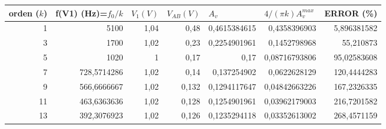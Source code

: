 \documentclass{article}
\begin{document}
\begin{table}[h]
\centering
\begin{tabular}{|r|r|r|r|r|r|r|}
\hline
\multicolumn{1}{|l|}{orden ($k$)} & \multicolumn{1}{l|}{f(V1) (Hz)=$f_0/k$} & \multicolumn{1}{l|}{$V_1(V)$} & \multicolumn{1}{l|}{$V_{AB}(V)$} & \multicolumn{1}{l|}{$A_v$} & \multicolumn{1}{l|}{$4/(\pi k) A_{v}^{max}$} & \multicolumn{1}{l|}{ERROR (\%)} \\ \hline
1                                            & 5100                                            & 1,04                          & 0,48                             & 0,4615384615               & 0,4358396903                                 & 5,896381582                     \\ \hline
3                                            & 1700                                            & 1,02                          & 0,23                             & 0,2254901961               & 0,1452798968                                 & 55,210873                       \\ \hline
5                                            & 1020                                            & 1                             & 0,17                             & 0,17                       & 0,08716793806                                & 95,02583608                     \\ \hline
7                                            & 728,5714286                                     & 1,02                          & 0,14                             & 0,137254902                & 0,0622628129                                 & 120,4444283                     \\ \hline
9                                            & 566,6666667                                     & 1,02                          & 0,132                            & 0,1294117647               & 0,04842663226                                & 167,2326335                     \\ \hline
11                                           & 463,6363636                                     & 1,02                          & 0,128                            & 0,1254901961               & 0,03962179003                                & 216,7201582                     \\ \hline
13                                           & 392,3076923                                     & 1,02                          & 0,126                            & 0,1235294118               & 0,03352613002                                & 268,4571159                     \\ \hline

\end{tabular}
\end{table}
\end{document}
